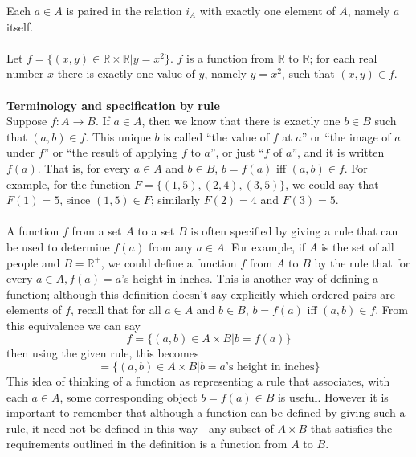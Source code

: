 \documentclass{report}
\theoremstyle{definition}
\begin{document}
Each $a\in A$ is paired in the relation $i_A$ with exactly one element of $A$, namely $a$ itself.\\
\vspace{1mm}\\
Let $f=\{(x,y)\in\mathbb R\times\mathbb R|y=x^2\}$. $f$ is a function from $\mathbb R$ to $\mathbb R$; for each real number $x$ there is exactly one value of $y$, namely $y=x^2$, such
that $(x,y)\in f$.\\
\vspace{1mm}\\
\textbf{Terminology and specification by rule}\\
Suppose $f:A\to B$. If $a\in A$, then we know that there is exactly one $b\in B$ such that $(a,b)\in f$. This unique $b$ is called ``the value of $f$ at $a$'' or ``the image of $a$ under $f$'' or 
``the result of applying $f$ to $a$'', or just ``$f$ of $a$'', and it is written $f(a)$. That is, for every $a\in A$ and $b\in B$, $b=f(a)$ iff $(a,b)\in f$.
For example, for the function $F=\{(1,5),(2,4),(3,5)\}$, we could say that $F(1)=5$, since $(1,5)\in F$; similarly $F(2)=4$ and $F(3)=5$.\\
\vspace{1mm}\\
A function $f$ from a set $A$ to a set $B$ is often specified by giving a rule that can be used to determine $f(a)$ from any $a\in A$. For example, if $A$ is the set of all people and 
$B=\mathbb R^+$, we could define a function $f$ from $A$ to $B$ by the rule that for every $a\in A, f(a)=a$'s height in inches.
This is another way of defining a function; although this definition doesn't say explicitly which ordered pairs are elements of $f$, recall that for all $a\in A$ and $b\in B$,
$b=f(a)$ iff $(a,b)\in f$. From this equivalence we can say
\begin{equation*}
f=\{(a,b)\in A\times B|b=f(a)\}
\end{equation*}
then using the given rule, this becomes
\begin{equation*}
=\{(a,b)\in A\times B|b=a\text{'s height in inches}\}
\end{equation*}
This idea of thinking of a function as representing a rule that associates, with each $a\in A$, some corresponding object $b=f(a)\in B$ is useful. However it is important 
to remember that although a function can be defined by giving such a rule, it need not be defined in this way---any subset of $A\times B$ that satisfies the requirements outlined in the definition 
is a function from $A$ to $B$.\\
\end{document}
